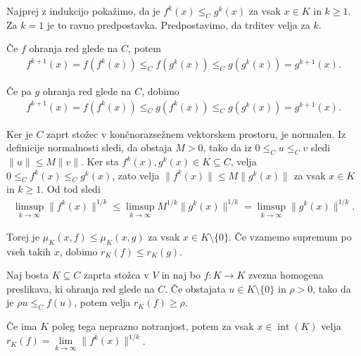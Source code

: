 \documentclass[mat2, tisk]{fmfdelo}
\begin{document}
\begin{dokaz}
  Najprej z indukcijo pokažimo, da je
  $f^k(x)\leq_C g^k(x)$ za vsak $x\in K$ in $k\geq1$. Za $k=1$ je to
  ravno predpostavka. Predpostavimo, da trditev velja za $k$.

  Če $f$ ohranja red glede na $C$, potem
  \begin{align*}
  f^{k+1}(x)
  =
  f(f^k(x))
  \leq_C
  f(g^k(x))
  \leq_C
  g(g^k(x))
  =
  g^{k+1}(x).
  \end{align*}

  Če pa $g$ ohranja red glede na $C$, dobimo
  \begin{align*}
  f^{k+1}(x)=f(f^k(x))
  \leq_Cg(f^k(x))
  \leq_Cg(g^k(x))
  =g^{k+1}(x).
  \end{align*}

  Ker je $C$ zaprt stožec v končnorazsežnem vektorskem prostoru, je
  normalen. Iz definicije normalnosti sledi, da obstaja $M>0$, tako da iz
  $0\leq_C u\leq_C v$ sledi $\|u\|\leq M\|v\|$.
  Ker sta $f^k(x),g^k(x)\in K\subseteq C$, velja
  $0\leq_C f^k(x)\leq_C g^k(x)$, zato velja 
  $\|f^k(x)\|\leq M\|g^k(x)\|$ za vsak $x\in K$ in $k\geq1$.
  Od tod sledi
  \begin{align*}
  \limsup_{k\to\infty}\|f^k(x)\|^{1/k}
  \leq
  \limsup_{k\to\infty} M^{1/k}\|g^k(x)\|^{1/k}
  = \limsup_{k\to\infty}\|g^k(x)\|^{1/k}.
  \end{align*}

  Torej je $\mu_K(x,f)\leq\mu_K(x,g)$ za vsak
  $x\in K\setminus\{0\}$. Če vzamemo supremum po vseh takih $x$, dobimo
  $r_K(f)\leq r_K(g)$.
\end{dokaz}

\begin{trditev}\label{trd:spodnja_meja_stozcnega_spektralnega_radija}
  Naj bosta $K\subseteq C$ zaprta stožca v $V$ in naj bo
  $f\colon K\longrightarrow K$ zvezna homogena preslikava, ki ohranja
  red glede na $C$. Če obstajata $u\in K\setminus\{0\}$ in $\rho>0$,
  tako da je $\rho u\leq_C f(u)$, potem velja $r_K(f)\geq\rho$.

  Če ima $K$ poleg tega neprazno notranjost, potem za vsak
  $x\in\operatorname{int}(K)$ velja
  $r_K(f)=\lim\limits_{k\to\infty}\|f^k(x)\|^{1/k}$.
\end{trditev}
\end{document}
